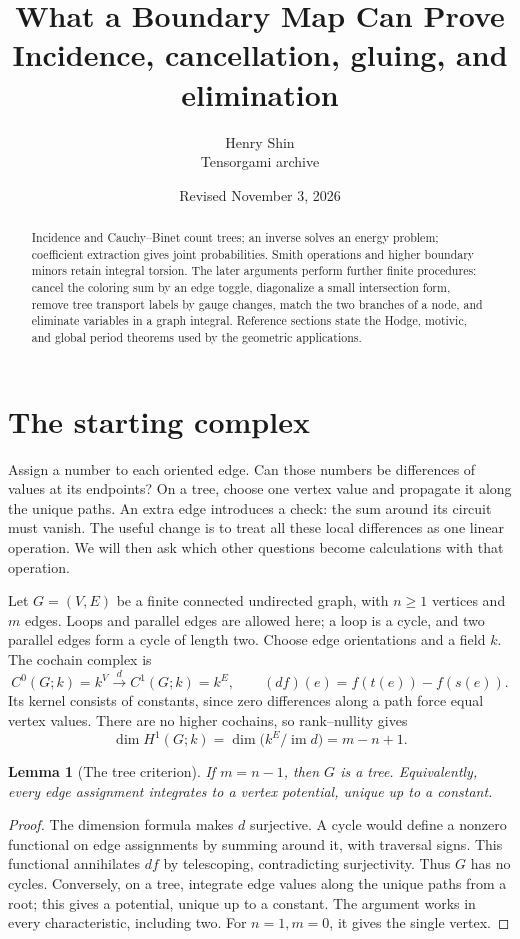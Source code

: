 \documentclass[11pt]{article}
\title{\textbf{What a Boundary Map Can Prove}\\[6pt]\large Incidence, cancellation, gluing, and elimination}
\author{Henry Shin\\\small Tensorgami archive}
\date{\small Revised November 3, 2026}
\newtheorem{lemma}[theorem]{Lemma}
\theoremstyle{definition}
\theoremstyle{remark}
\begin{document}
\maketitle\thispagestyle{empty}
\begin{abstract}
 Incidence and Cauchy--Binet count trees; an inverse solves an energy problem; coefficient extraction gives joint probabilities. Smith operations and higher boundary minors retain integral torsion. The later arguments perform further finite procedures: cancel the coloring sum by an edge toggle, diagonalize a small intersection form, remove tree transport labels by gauge changes, match the two branches of a node, and eliminate variables in a graph integral. Reference sections state the Hodge, motivic, and global period theorems used by the geometric applications.
\end{abstract}
\clearpage
\begingroup\setlength{\parskip}{0pt}\fontsize{10}{12}\selectfont\tableofcontents\endgroup
\clearpage

\section{The starting complex}
\label{sec:tree}

Assign a number to each oriented edge. Can those numbers be differences of values at its endpoints? On a tree, choose one vertex value and propagate it along the unique paths. An extra edge introduces a check: the sum around its circuit must vanish. The useful change is to treat all these local differences as one linear operation. We will then ask which other questions become calculations with that operation.

Let \(G=(V,E)\) be a finite connected undirected graph, with \(n\ge1\) vertices and \(m\) edges. Loops and parallel edges are allowed here; a loop is a cycle, and two parallel edges form a cycle of length two. Choose edge orientations and a field \(k\). The cochain complex is
\[
 C^0(G;k)=k^V\xrightarrow{d}C^1(G;k)=k^E,
 \qquad (df)(e)=f(t(e))-f(s(e)).
\]
Its kernel consists of constants, since zero differences along a path force equal vertex values. There are no higher cochains, so rank--nullity gives
\begin{equation}\label{eq:cycle-rank}
 \dim H^1(G;k)=\dim\bigl(k^E/\operatorname{im}d\bigr)=m-n+1.
\end{equation}

\begin{lemma}[The tree criterion]\label{thm:tree}
If \(m=n-1\), then \(G\) is a tree. Equivalently, every edge assignment integrates to a vertex potential, unique up to a constant.
\end{lemma}
\begin{proof}
The dimension formula makes \(d\) surjective. A cycle would define a nonzero functional on edge assignments by summing around it, with traversal signs. This functional annihilates \(df\) by telescoping, contradicting surjectivity. Thus \(G\) has no cycles. Conversely, on a tree, integrate edge values along the unique paths from a root; this gives a potential, unique up to a constant. The argument works in every characteristic, including two. For \(n=1,m=0\), it gives the single vertex.
\end{proof}
\end{document}

